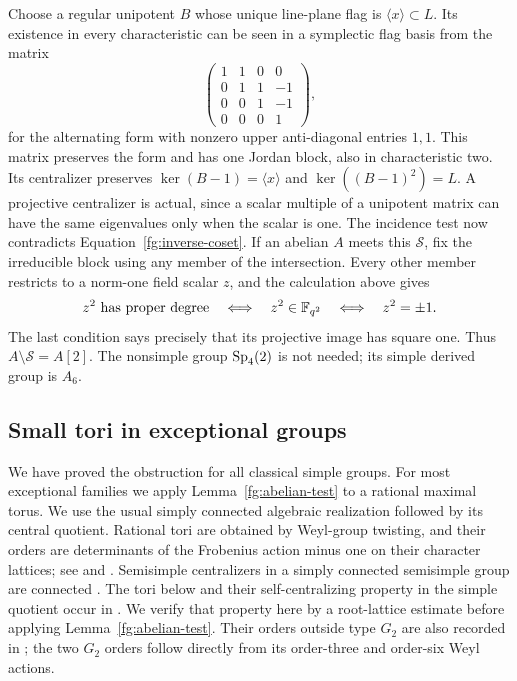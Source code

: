 Choose a regular unipotent $B$ whose unique line-plane flag is
$\langle x\rangle\subset L$. Its existence in every characteristic
can be seen in a symplectic flag basis from the matrix
\[
 \begin{pmatrix}
 1&1&0&0\\0&1&1&-1\\0&0&1&-1\\0&0&0&1
 \end{pmatrix},
\]
for the alternating form with nonzero upper anti-diagonal entries
$1,1$. This matrix preserves the form and has one Jordan block,
also in characteristic two. Its centralizer preserves
$\ker(B-1)=\langle x\rangle$ and $\ker((B-1)^2)=L$.
A projective centralizer is actual, since a scalar multiple of
a unipotent matrix can have the same eigenvalues only when the
scalar is one. The incidence test now contradicts
Equation~\eqref{fg:inverse-coset}. If an abelian $A$ meets this $\mathcal S$, fix the irreducible block
using any member of the intersection. Every other member restricts to a
norm-one field scalar $z$, and the calculation above gives
\[
 z^2\text{ has proper degree}
 \quad\Longleftrightarrow\quad z^2\in\mathbb F_{q^2}
 \quad\Longleftrightarrow\quad z^2=\pm1.
\]
The last condition says precisely that its projective image has square
one. Thus $A\setminus\mathcal S=A[2]$. The nonsimple group
$\operatorname{Sp}_4(2)$ is not needed; its simple derived group is $A_6$.

\subsection{Small tori in exceptional groups}

We have proved the obstruction for all classical simple groups.
For most exceptional families we apply
Lemma~\ref{fg:abelian-test} to a rational maximal torus.
We use the usual simply connected algebraic realization followed
by its central quotient. Rational tori are obtained by Weyl-group
twisting, and their orders are determinants of the Frobenius action
minus one on their character lattices; see \cite{Steinberg} and
\cite[Propositions~25.1--25.3, pp.~219--220]{MalleTesterman}. Semisimple centralizers
in a simply connected semisimple group are connected
\cite[Remark~2.10]{SteinbergRegular1965}. The tori below and their
self-centralizing property in the simple quotient occur in
\cite[Corollary~8.2 and Lemma~8.7]{SegevSeitz2002}.
We verify that property here by a root-lattice estimate before applying
Lemma~\ref{fg:abelian-test}. Their orders outside type $G_2$
are also recorded in \cite[Section~3]{GarionLarsenLubotzky}; the two
$G_2$ orders follow directly from its order-three and order-six Weyl
actions.

